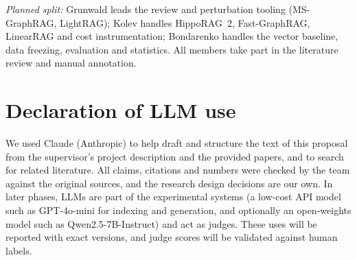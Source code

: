 \documentclass[11pt]{article}
\begin{document}
\noindent\textit{Planned split:} Grunwald leads the review and perturbation tooling (MS-GraphRAG, LightRAG); Kolev handles HippoRAG~2, Fast-GraphRAG, LinearRAG and cost instrumentation; Bondarenko handles the vector baseline, data freezing, evaluation and statistics. All members take part in the literature review and manual annotation.

\section{Declaration of LLM use}
\label{sec:llm}
We used Claude (Anthropic) to help draft and structure the text of this proposal from the supervisor's project description and the provided papers, and to search for related literature. All claims, citations and numbers were checked by the team against the original sources, and the research design decisions are our own. In later phases, LLMs are part of the experimental systems (a low-cost API model such as GPT-4o-mini for indexing and generation, and optionally an open-weights model such as Qwen2.5-7B-Instruct) and act as judges. These uses will be reported with exact versions, and judge scores will be validated against human labels.



\end{document}
